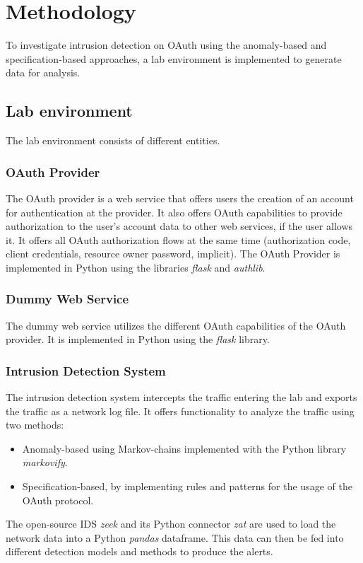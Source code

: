 \documentclass{article}
\begin{document}
\section{Methodology}
To investigate intrusion detection on OAuth using the anomaly-based and specification-based approaches, a lab environment is implemented to generate data for analysis.

\subsection{Lab environment}
The lab environment consists of different entities.

\subsubsection{OAuth Provider}
The OAuth provider is a web service that offers users the creation of an account for authentication at the provider. It also offers OAuth capabilities to provide authorization to the user's account data to other web services, if the user allows it. It offers all OAuth authorization flows at the same time (authorization code, client credentials, resource owner password, implicit). The OAuth Provider is implemented in Python using the libraries \emph{flask} and \emph{authlib}.

\subsubsection{Dummy Web Service}
The dummy web service utilizes the different OAuth capabilities of the OAuth provider. It is implemented in Python using the \emph{flask} library.

\subsubsection{Intrusion Detection System}
The intrusion detection system intercepts the traffic entering the lab and exports the traffic as a network log file. It offers functionality to analyze the traffic using two methods:

\begin{itemize}
    \item Anomaly-based using Markov-chains implemented with the Python library \emph{markovify}.
    \item Specification-based, by implementing rules and patterns for the usage of the OAuth protocol.
\end{itemize}
The open-source IDS \emph{zeek} and its Python connector \emph{zat} are used to load the network data into a Python \emph{pandas} dataframe. This data can then be fed into different detection models and methods to produce the alerts.
\end{document}
